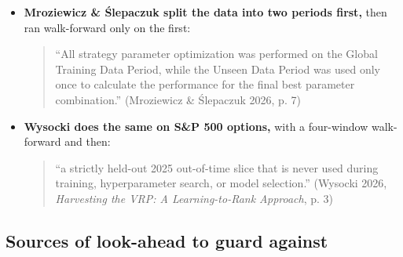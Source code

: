 \documentclass{article}
\begin{document}
\begin{itemize}

\item \textbf{Mroziewicz \& \'{S}lepaczuk split the data into two periods first,} then ran walk-forward only on the first:

\begin{quote}``All strategy parameter optimization was performed on the Global Training Data Period, while the Unseen Data Period was used only once to calculate the performance for the final best parameter combination.'' (Mroziewicz \& \'{S}lepaczuk 2026, p. 7)\end{quote}

\item \textbf{Wysocki does the same on S\&P 500 options,} with a four-window walk-forward and then:

\begin{quote}``a strictly held-out 2025 out-of-time slice that is never used during training, hyperparameter search, or model selection.'' (Wysocki 2026, \emph{Harvesting the VRP: A Learning-to-Rank Approach}, p. 3)\end{quote}

\end{itemize}

\subsection{Sources of look-ahead to guard against}
\end{document}
